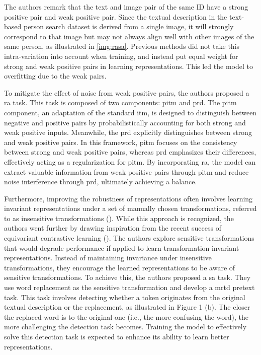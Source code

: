 The authors remark that the text and image pair of the same ID have a strong positive pair and weak positive pair. Since the textual description in the text-based person search dataset is derived from a single image, it will strongly correspond to that image but may not always align well with other images of the same person, as illustrated in \ref{img:rasa}.
Previous methods did not take this intra-variation into account when training, and instead put equal weight for strong and weak positive pairs in learning representations. This led the model to overfitting due to the weak pairs.

To mitigate the effect of noise from weak positive pairs, the authors proposed a \acrfull{ra} task. This task is composed of two components: \acrfull{pitm} and \acrfull{prd}. The \acrshort{pitm} component, an adaptation of the standard \acrshort{itm}, is designed to distinguish between negative and positive pairs by probabilistically accounting for both strong and weak positive inputs.
Meanwhile, the \acrshort{prd} explicitly distinguishes between strong and weak positive pairs. In this framework, \acrshort{pitm} focuses on the consistency between strong and weak positive pairs, whereas \acrshort{prd} emphasizes their differences, effectively acting as a regularization for \acrshort{pitm}. By incorporating \acrshort{ra}, the model can extract valuable information from weak positive pairs through \acrshort{pitm} and reduce noise interference through \acrshort{prd}, ultimately achieving a balance.

Furthermore, improving the robustness of representations often involves learning invariant representations under a set of manually chosen transformations, referred to as insensitive transformations (\cite{caron2021unsupervisedlearningvisualfeatures}). While this approach is recognized, the authors went further by drawing inspiration from the recent success of equivariant contrastive learning (\cite{dangovski2022equivariantcontrastivelearning}). The authors explore sensitive transformations that would degrade performance if applied to learn transformation-invariant representations. Instead of maintaining invariance under insensitive transformations, they encourage the learned representations to be aware of sensitive transformations. 
To achieve this, the authors proposed a \acrfull{sa} task. They use word replacement as the sensitive transformation and develop a \acrfull{mrtd} pretext task. This task involves detecting whether a token originates from the original textual description or the replacement, as illustrated in Figure 1 (b). The closer the replaced word is to the original one (i.e., the more confusing the word), the more challenging the detection task becomes. Training the model to effectively solve this detection task is expected to enhance its ability to learn better representations.

